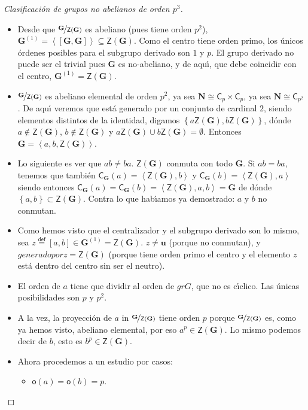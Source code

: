 \documentclass[final,12pt,a4paper,twoside,fleqn]{extbook}
\newcommand{\entreparentesis}[1]{\ensuremath{
        \left({#1}\right)
}}
\newcommand{\entrecorchetes}[1]{\ensuremath{
        \left\lbrack{#1}\right\rbrack
}}
\newcommand{\entreangulos}[1]{\ensuremath{\left\langle{#1}\right\rangle}}
\newcommand{\mathdef}{\ensuremath{\stackrel{\mathsf{def}}{{}={}}}}
\newcommand{\set}[1]{\ensuremath{\left\lbrace{#1}\right\rbrace}}
\newcommand{\generadoporUitem}[1]{\ensuremath{
        \entreangulos{#1}
}}
\newcommand{\generadopor}[1]{\ensuremath{
        \generadoporUitem{#1}
}}
\newcommand{\grG}{\ensuremath{\mathbf{G}}}
\newcommand{\grN}{\ensuremath{\mathbf{N}}}
\newcommand{\grcoc}[2]{\ensuremath{
        \nicefrac{#1}{#2}
}}
\newcommand{\grclass}[1]{\ensuremath{\mathsf{#1}}}
\newcommand{\cyclicgr}[1]{\ensuremath{{\grclass{C}}_{#1}}}
\newcommand{\pd}[2]{\ensuremath{{#1}\!          \times          \!{#2}}}
\newcommand{\pdcyclics}[2]{\ensuremath{\pd{\cyclicgr{#1}}{\cyclicgr{#2}}}}
\newcommand{\centralizador}[2]{\ensuremath{
        {{\mathsf{C}}_{#1}}
        {\left({#2}\right)}
}}
\newcommand{\centro}[1]{\ensuremath{
        {\mathsf{Z}}
        {\left({#1}\right)}
}}
\newcommand{\grderivado}[2]{\ensuremath{
        {#1}^{\entreparentesis{#2}}
}}
\newcommand{\conmutador}[2]{\ensuremath{
        \entrecorchetes{#1,#2}
}}
\newcommand{\neutromult}{\ensuremath{\mathbf{u}}}
\newcommand{\unity}{\ensuremath{\neutromult}}
\theoremstyle{definition}
\theoremstyle{remark}
\begin{document}
\begin{proof}[Clasificaci\'on de grupos no abelianos de orden $p^3$]
\begin{itemize}
\item[4]
Desde que $\grcoc{\grG}{\centro{\grG}}$ es abeliano (pues tiene orden $p^2$), $\grderivado{\grG}{1}=\generadopor{\conmutador{\grG}{\grG}}         \subseteq \centro{\grG}$. Como el centro tiene orden primo, los \'unicos \'ordenes posibles para el subgrupo derivado son $1$ y $p$. El grupo derivado no puede ser el trivial pues $\grG$ es no-abeliano, y de aqu{\'{\i}}, que debe coincidir con el centro, $\grderivado{\grG}{1}=\centro{\grG}$.
\item[5]
$\grcoc{\grG}{\centro{\grG}}$ es abeliano elemental de orden $p^2$, ya sea $\grN         \cong         \pdcyclics{p}{p}$, ya sea $\grN         \cong         \cyclicgr{p^2}$. De aqu{\'{\i}} veremos que est\'a generado por un conjunto de cardinal $2$, siendo elementos distintos de la identidad, digamos $\set{a\centro{\grG},b\centro{\grG}}$, d\'onde $a         \notin          \centro{\grG}$, $b         \notin          \centro{\grG}$ y $a\centro{\grG}         \cup          b\centro{\grG}=\emptyset$. Entonces $\grG=\generadopor{a,b,\centro{\grG}}$.
\item[6]
Lo siguiente es ver que $ab         \neq          ba$. $\centro{\grG}$ conmuta con todo $\grG$. Si $ab=ba$, tenemos que tambi\'en $\centralizador{\grG}{a}=\generadopor{\centro{\grG},b}$ y $\centralizador{\grG}{b}=\generadopor{\centro{\grG},a}$ siendo entonces $\centralizador{\grG}{a}=\centralizador{\grG}{b}=\generadopor{\centro{\grG},a,b}=\grG$ de d\'onde $\set{a,b}         \subset \centro{\grG}$. Contra lo que hab{\'{\i}}amos ya demostrado: $a$ y $b$ no conmutan.
\item[7]
Como hemos visto que el centralizador y el subgrupo derivado son lo mismo, sea $z\mathdef\conmutador{a}{b}         \in \grderivado{\grG}{1}=\centro{\grG}$. $z         \neq         \unity$ (porque no conmutan), y $generadopor{z}=\centro{\grG}$ (porque tiene orden primo el centro y el elemento $z$ est\'a dentro del centro sin ser el neutro).
\item[8]
El orden de $a$ tiene que dividir al orden de $grG$, que no es c{\'{\i}}clico. Las \'unicas posibilidades son $p$ y $p^2$.
\item[9]
A la vez, la proyecci\'on de $a$ in $\grcoc{\grG}{\centro{\grG}}$ tiene orden $p$ porque $\grcoc{\grG}{\centro{\grG}}$ es, como ya hemos visto, abeliano elemental, por eso $a^p          \in \centro{\grG}$. Lo mismo podemos decir de $b$, esto es $b^p          \in \centro{\grG}$.
\item[10]
Ahora procedemos a un estudio por casos:
\begin{itemize}
    \item[10.1]
    \textbf{$\mathsf{o}(a)=\mathsf{o}(b)=p$}.


\end{itemize}
\end{itemize}
\end{proof}
\end{document}
